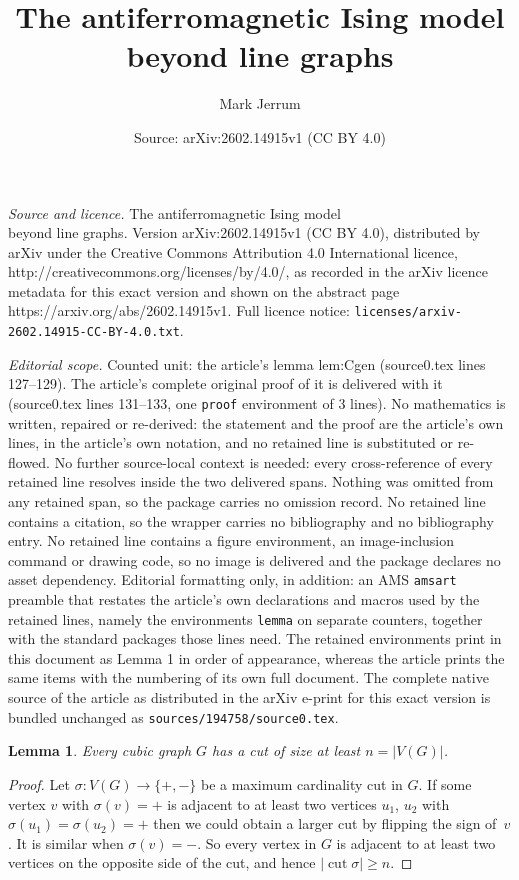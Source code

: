 \documentclass[10pt,a4paper]{amsart}
\title{The antiferromagnetic Ising model\\ beyond line graphs}
\author{Mark Jerrum}
\date{Source: arXiv:2602.14915v1 (CC BY 4.0)}
\newtheorem{lemma}{Lemma}
\newcommand{\cut}{\mathop{\mathrm{cut}}}
\begin{document}
\maketitle

\noindent\emph{Source and licence.} The antiferromagnetic Ising model\\ beyond line graphs. Version arXiv:2602.14915v1 (CC BY 4.0), distributed by arXiv under the Creative Commons Attribution 4.0 International licence, http://creativecommons.org/licenses/by/4.0/, as recorded in the arXiv licence metadata for this exact version and shown on the abstract page https://arxiv.org/abs/2602.14915v1. Full licence notice: \texttt{licenses/arxiv-2602.14915-CC-BY-4.0.txt}.\par\smallskip

\noindent\textit{Editorial scope.} Counted unit: the article's lemma lem:Cgen (source0.tex lines 127--129). The article's complete original proof of it is delivered with it (source0.tex lines 131--133, one \texttt{proof} environment of 3 lines). No mathematics is written, repaired or re-derived: the statement and the proof are the article's own lines, in the article's own notation, and no retained line is substituted or re-flowed.  No further source-local context is needed: every cross-reference of every retained line resolves inside the two delivered spans.  Nothing was omitted from any retained span, so the package carries no omission record.  No retained line contains a citation, so the wrapper carries no bibliography and no bibliography entry.  No retained line contains a figure environment, an image-inclusion command or drawing code, so no image is delivered and the package declares no asset dependency.  Editorial formatting only, in addition: an AMS \texttt{amsart} preamble that restates the article's own declarations and macros used by the retained lines, namely the environments \texttt{lemma} on separate counters, together with the standard packages those lines need.  The retained environments print in this document as Lemma 1 in order of appearance, whereas the article prints the same items with the numbering of its own full document.  The complete native source of the article as distributed in the arXiv e-print for this exact version is bundled unchanged as \texttt{sources/194758/source0.tex}.
\begin{lemma}\label{lem:Cgen}
Every cubic graph $G$ has a cut of size at least $n=|V(G)|$.
\end{lemma}

\begin{proof}
Let $\sigma:V(G)\to\{+,-\}$ be a maximum cardinality cut in $G$.  If some vertex $v$ with $\sigma(v)={+}$ is adjacent to at least two vertices $u_1$, $u_2$ with $\sigma(u_1)=\sigma(u_2)={+}$ then we could obtain a larger cut by flipping the sign of~$v$.  It is similar when $\sigma(v)={-}$.  So every vertex in $G$ is adjacent to at least two vertices on the opposite side of the cut, and hence $|\cut\sigma|\geq n$.
\end{proof}
\end{document}
